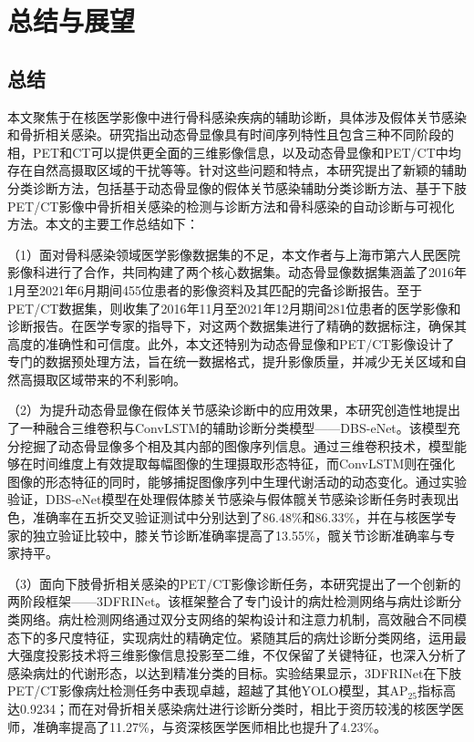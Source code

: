 \chapter{总结与展望}

\section{总结}

本文聚焦于在核医学影像中进行骨科感染疾病的辅助诊断，具体涉及假体关节感染和骨折相关感染。研究指出动态骨显像具有时间序列特性且包含三种不同阶段的相，PET和CT可以提供更全面的三维影像信息，以及动态骨显像和PET/CT中均存在自然高摄取区域的干扰等等。针对这些问题和特点，本研究提出了新颖的辅助分类诊断方法，包括基于动态骨显像的假体关节感染辅助分类诊断方法、基于下肢PET/CT影像中骨折相关感染的检测与诊断方法和骨科感染的自动诊断与可视化方法。本文的主要工作总结如下：

（1）面对骨科感染领域医学影像数据集的不足，本文作者与上海市第六人民医院影像科进行了合作，共同构建了两个核心数据集。动态骨显像数据集涵盖了2016年1月至2021年6月期间455位患者的影像资料及其匹配的完备诊断报告。至于PET/CT数据集，则收集了2016年11月至2021年12月期间281位患者的医学影像和诊断报告。在医学专家的指导下，对这两个数据集进行了精确的数据标注，确保其高度的准确性和可信度。此外，本文还特别为动态骨显像和PET/CT影像设计了专门的数据预处理方法，旨在统一数据格式，提升影像质量，并减少无关区域和自然高摄取区域带来的不利影响。

（2）为提升动态骨显像在假体关节感染诊断中的应用效果，本研究创造性地提出了一种融合三维卷积与ConvLSTM的辅助诊断分类模型——DBS-eNet。该模型充分挖掘了动态骨显像多个相及其内部的图像序列信息。通过三维卷积技术，模型能够在时间维度上有效提取每幅图像的生理摄取形态特征，而ConvLSTM则在强化图像的形态特征的同时，能够捕捉图像序列中生理代谢活动的动态变化。通过实验验证，DBS-eNet模型在处理假体膝关节感染与假体髋关节感染诊断任务时表现出色，准确率在五折交叉验证测试中分别达到了86.48\%和86.33\%，并在与核医学专家的独立验证比较中，膝关节诊断准确率提高了13.55\%，髋关节诊断准确率与专家持平。

（3）面向下肢骨折相关感染的PET/CT影像诊断任务，本研究提出了一个创新的两阶段框架——3DFRINet。该框架整合了专门设计的病灶检测网络与病灶诊断分类网络。病灶检测网络通过双分支网络的架构设计和注意力机制，高效融合不同模态下的多尺度特征，实现病灶的精确定位。紧随其后的病灶诊断分类网络，运用最大强度投影技术将三维影像信息投影至二维，不仅保留了关键特征，也深入分析了感染病灶的代谢形态，以达到精准分类的目标。实验结果显示，3DFRINet在下肢PET/CT影像病灶检测任务中表现卓越，超越了其他YOLO模型，其AP\(_{25}\)指标高达0.9234；而在对骨折相关感染病灶进行诊断分类时，相比于资历较浅的核医学医师，准确率提高了11.27\%，与资深核医学医师相比也提升了4.23\%。

